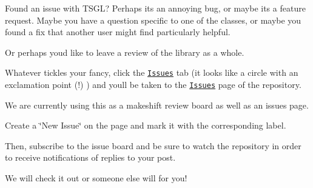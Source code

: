 Found an issue with T\+S\+G\+L? Perhaps its an annoying bug, or maybe its a feature request. Maybe you have a question specific to one of the classes, or maybe you found a fix that another user might find particularly helpful.

Or perhaps you\textquotesingle{}d like to leave a review of the library as a whole.

Whatever tickles your fancy, click the \href{https://github.com/Calvin-CS/TSGL/issues}{\tt Issues} tab (it looks like a circle with an exclamation point (!) ) and you\textquotesingle{}ll be taken to the \href{https://github.com/Calvin-CS/TSGL/issues}{\tt Issues} page of the repository.

We are currently using this as a makeshift review board as well as an issues page.

Create a \char`\"{}\+New Issue\char`\"{} on the page and mark it with the corresponding label.

Then, subscribe to the issue board and be sure to watch the repository in order to receive notifications of replies to your post.

We will check it out or someone else will for you! 